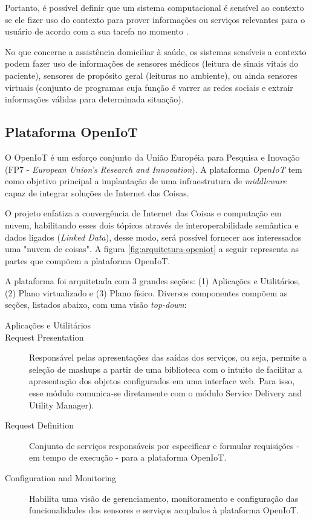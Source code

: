 Portanto, é possível definir que um sistema computacional é sensível ao contexto
se ele fizer uso do contexto para prover informações ou serviços relevantes para
o usuário de acordo com a sua tarefa no momento \cite{dey2001understanding}.

No que concerne a assistência domiciliar à saúde, os sistemas sensíveis a
contexto podem fazer uso de informações de sensores médicos (leitura de sinais 
vitais do paciente), sensores de propósito geral (leituras no ambiente), 
ou ainda sensores virtuais (conjunto de programas cuja função é varrer as redes 
sociais e extrair informações válidas para determinada situação).

\subsection{Plataforma OpenIoT}\label{subsec:openiot}

O OpenIoT é um esforço conjunto da União Européia para Pesquisa e Inovação (FP7
- \textit{European Union's Research and Innovation}). A plataforma 
\textit{OpenIoT} tem como objetivo principal a implantação de uma infraestrutura 
de \textit{middleware} capaz de integrar soluções de Internet das Coisas.

O projeto enfatiza a convergência de Internet das Coisas e computação em nuvem,
habilitando esses dois tópicos através de interoperabilidade semântica e dados
ligados (\textit{Linked Data}), desse modo, será possível fornecer aos
interessados uma "nuvem de coisas". A figura \ref{fig:arquitetura-openiot} a 
seguir representa  as partes que compõem a plataforma OpenIoT.

    
A plataforma foi arquitetada com 3 grandes seções: (1) Aplicações e Utilitários,
(2) Plano virtualizado e (3) Plano físico. Diversos componentes compõem as 
seções, listados abaixo, com uma visão \textit{top-down}:

\begin{description}
  \item [Aplicações e Utilitários]
  \item [Request Presentation] Responsável pelas apresentações das saídas dos serviços,
ou seja, permite a seleção de mashups a partir de uma biblioteca com o intuito
de facilitar a apresentação dos objetos configurados em uma interface web. Para
isso, esse módulo comunica-se diretamente com o módulo Service Delivery and
Utility Manager).

  \item [Request Definition] Conjunto de serviços responsáveis por especificar e
formular requisições - em tempo de execução - para a plataforma OpenIoT.

  \item [Configuration and Monitoring] Habilita uma visão de gerenciamento,
monitoramento e configuração das funcionalidades dos sensores e serviços
acoplados à plataforma OpenIoT.
\end{description}


